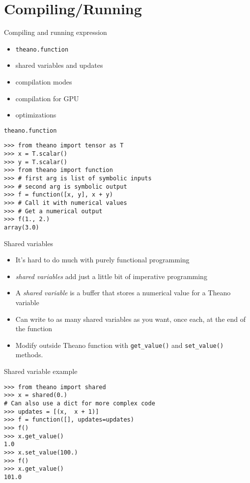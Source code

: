 \documentclass[utf8x,hyperref={pdfpagelabels=false}]{beamer}
\newcommand{\code}[1]{\lstinline[emph={[2]}]|#1|}
\begin{document}
\section{Compiling/Running}
\begin{frame}{Compiling and running expression}
  \begin{itemize}
  \item \code{theano.function}
  \item shared variables and updates
  \item compilation modes
  \item compilation for GPU
  \item optimizations
  \end{itemize}
\end{frame}

\begin{frame}[fragile]{\code{theano.function}}

\begin{lstlisting}
>>> from theano import tensor as T
>>> x = T.scalar()
>>> y = T.scalar()
>>> from theano import function
>>> # first arg is list of symbolic inputs
>>> # second arg is symbolic output
>>> f = function([x, y], x + y)
>>> # Call it with numerical values
>>> # Get a numerical output
>>> f(1., 2.)
array(3.0)
\end{lstlisting}
\end{frame}

\begin{frame}{Shared variables}
  \begin{itemize}
  \item It’s hard to do much with purely functional programming
  \item \emph{shared variables} add just a little bit of imperative programming
  \item A \emph{shared variable} is a buffer that stores a numerical value for a Theano variable
  \item Can write to as many shared variables as you want, once each, at the end of the function
  \item  Modify outside Theano function with \code{get_value()} and \code{set_value()} methods.
  \end{itemize}
\end{frame}

\begin{frame}[fragile]{Shared variable example}
\begin{lstlisting}
>>> from theano import shared
>>> x = shared(0.)
# Can also use a dict for more complex code
>>> updates = [(x,  x + 1)]
>>> f = function([], updates=updates)
>>> f()
>>> x.get_value()
1.0
>>> x.set_value(100.)
>>> f()
>>> x.get_value()
101.0
\end{lstlisting}
\end{frame}
\end{document}
